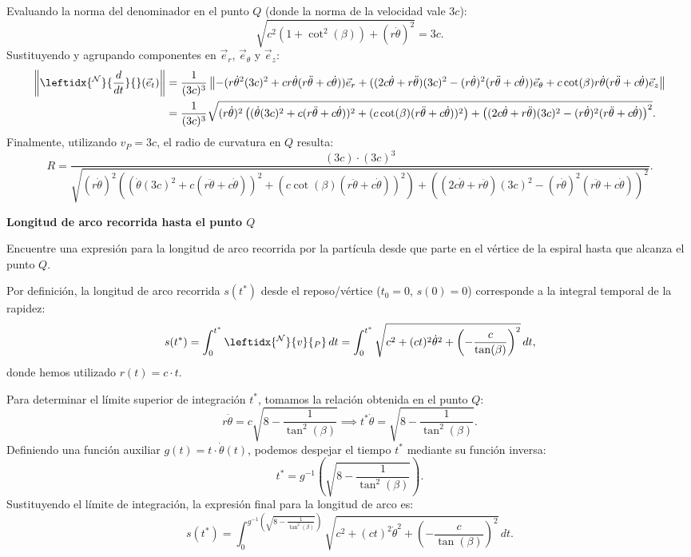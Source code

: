 \begin{tcolorbox}[title=Arbol de Navidad(pero sin condicion de R y $\theta$),breakable]
Evaluando la norma del denominador en el punto $Q$ (donde la norma de la velocidad vale $3c$):
\[
    \sqrt{c^2(1+\cot^2(\beta)) + (r\dot{\theta})^2} = 3c.
\]
Sustituyendo y agrupando componentes en $\vec{e}_r$, $\vec{e}_\theta$ y $\vec{e}_z$:
\begin{align*}
    \left\| \leftidx{^{\mathcal{N}}}{\frac{d}{dt}}{} (\vec{e}_t) \right\| &= \frac{1}{(3c)^3} \left\| -(r\dot{\theta}^2(3c)^2 + c r\dot{\theta}(r\ddot{\theta}+c\dot{\theta}))\vec{e}_r + ((2c\dot{\theta}+r\ddot{\theta})(3c)^2 - (r\dot{\theta})^2(r\ddot{\theta}+c\dot{\theta}))\vec{e}_{\theta} + c\cot(\beta)r\dot{\theta}(r\ddot{\theta}+c\dot{\theta})\vec{e}_z \right\| \\
    &= \frac{1}{(3c)^3} \sqrt{ (r\dot{\theta})^2 \left( (\dot{\theta}(3c)^2 + c(r\ddot{\theta}+c\dot{\theta}))^2 + (c\cot(\beta)(r\ddot{\theta}+c\dot{\theta}))^2 \right) + \left( (2c\dot{\theta}+r\ddot{\theta})(3c)^2 - (r\dot{\theta})^2(r\ddot{\theta}+c\dot{\theta}) \right)^2 }.
\end{align*}
Finalmente, utilizando $v_P = 3c$, el radio de curvatura en $Q$ resulta:
\[
    R = \frac{(3c) \cdot (3c)^3}{\sqrt{ (r\dot{\theta})^2 \left( (\dot{\theta}(3c)^2 + c(r\ddot{\theta}+c\dot{\theta}))^2 + (c\cot(\beta)(r\ddot{\theta}+c\dot{\theta}))^2 \right) + \left( (2c\dot{\theta}+r\ddot{\theta})(3c)^2 - (r\dot{\theta})^2(r\ddot{\theta}+c\dot{\theta}) \right)^2 }}.
\]

\vspace{0.8em}
\noindent\textbf{Longitud de arco recorrida hasta el punto $Q$}

Encuentre una expresión para la longitud de arco recorrida por la partícula desde que parte en el vértice de la espiral hasta que alcanza el punto $Q$.

Por definición, la longitud de arco recorrida $s(t^*)$ desde el reposo/vértice ($t_0 = 0$, $s(0) = 0$) corresponde a la integral temporal de la rapidez:
\[
    s(t^*) = \int_{0}^{t^*} \leftidx{^{\mathcal{N}}}{v}{_P} \, dt = \int_{0}^{t^*} \sqrt{ c^2 + (ct)^2\dot{\theta}^2 + \left( -\frac{c}{\tan(\beta)} \right)^2 } \, dt,
\]
donde hemos utilizado $r(t) = c \cdot t$.

Para determinar el límite superior de integración $t^*$, tomamos la relación obtenida en el punto $Q$:
\[
    r\dot{\theta} = c \sqrt{8 - \frac{1}{\tan^2(\beta)}} \implies t^* \dot{\theta} = \sqrt{8 - \frac{1}{\tan^2(\beta)}}.
\]
Definiendo una función auxiliar $g(t) = t \cdot \dot{\theta}(t)$, podemos despejar el tiempo $t^*$ mediante su función inversa:
\[
    t^* = g^{-1}\left( \sqrt{8 - \frac{1}{\tan^2(\beta)}} \right).
\]
Sustituyendo el límite de integración, la expresión final para la longitud de arco es:
\[
    s(t^*) = \int_{0}^{g^{-1}\left( \sqrt{8 - \frac{1}{\tan^2(\beta)}} \right)} \sqrt{ c^2 + (ct)^2\dot{\theta}^2 + \left( -\frac{c}{\tan(\beta)} \right)^2 } \, dt.
\]
\end{tcolorbox}
\fi
